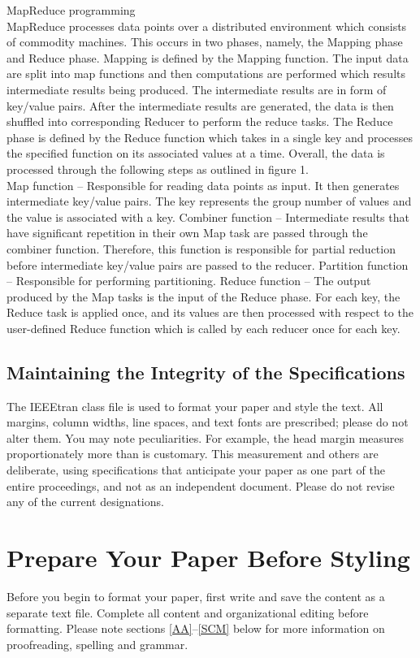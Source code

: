 \documentclass[conference]{IEEEtran}
\begin{document}
MapReduce programming\\

MapReduce processes data points over a distributed environment which consists of commodity machines. This occurs in two phases, namely, the Mapping phase and Reduce phase. Mapping is defined by the Mapping function. The input data are split into map functions and then computations are performed which results intermediate results being produced. The intermediate results are in form of key/value pairs. After the intermediate results are generated, the data is then shuffled into corresponding Reducer to perform the reduce tasks. The Reduce phase is defined by the Reduce function which takes in a single key and processes the specified function on its associated values at a time. Overall, the data is processed through the following steps as outlined in figure 1.\\

Map function – Responsible for reading data points as input. It then generates intermediate key/value pairs. The key represents the group number of values and the value is associated with a key.
Combiner function – Intermediate results that have significant repetition in their own Map task are passed through the combiner function. Therefore, this function is responsible for partial reduction before intermediate key/value pairs are passed to the reducer. 
Partition function – Responsible for performing partitioning.
Reduce function – The output produced by the Map tasks is the input of the Reduce phase. For each key, the Reduce task is applied once, and its values are then processed with respect to the user-defined Reduce function which is called by each reducer once for each key.
  

\subsection{Maintaining the Integrity of the Specifications}

The IEEEtran class file is used to format your paper and style the text. All margins, 
column widths, line spaces, and text fonts are prescribed; please do not 
alter them. You may note peculiarities. For example, the head margin
measures proportionately more than is customary. This measurement 
and others are deliberate, using specifications that anticipate your paper 
as one part of the entire proceedings, and not as an independent document. 
Please do not revise any of the current designations.

\section{Prepare Your Paper Before Styling}
Before you begin to format your paper, first write and save the content as a 
separate text file. Complete all content and organizational editing before 
formatting. Please note sections \ref{AA}--\ref{SCM} below for more information on 
proofreading, spelling and grammar.
\end{document}
